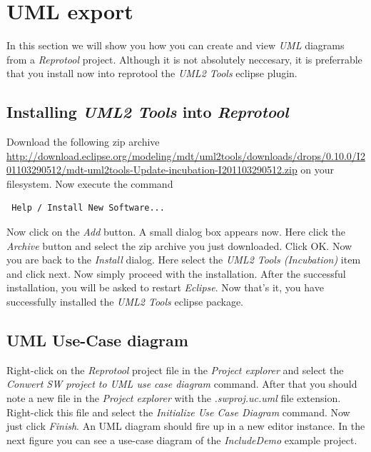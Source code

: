 \section{UML export}

In this section we will show you how you can create and view \emph{UML} diagrams from a \emph{Reprotool} project. Although it is not
absolutely neccesary, it is preferrable that you install now into reprotool the \emph{UML2 Tools} eclipse plugin.

\subsection{Installing \emph{UML2 Tools} into \emph{Reprotool}}

Download the following zip archive \url{http://download.eclipse.org/modeling/mdt/uml2tools/downloads/drops/0.10.0/I201103290512/mdt-uml2tools-Update-incubation-I201103290512.zip}
on your filesystem. Now execute the command
\begin{verbatim}
 Help / Install New Software...
\end{verbatim}
Now click on the \emph{Add} button. A small dialog box appears now. Here click the \emph{Archive} button and select the zip archive
you just downloaded. Click OK. Now you are back to the \emph{Install} dialog. Here select the \emph{UML2 Tools (Incubation)} item and
click next. Now simply proceed with the installation. After the successful installation, you will be asked to restart \emph{Eclipse}.
Now that's it, you have successfully installed the \emph{UML2 Tools} eclipse package.

\subsection{UML Use-Case diagram}

Right-click on the \emph{Reprotool} project file in the \emph{Project explorer} and select the \emph{Conwert SW project to UML use case
diagram} command. After that you should note a new file in the \emph{Project explorer} with the \emph{.swproj.uc.uml} file extension.
Right-click this file and select the \emph{Initialize Use Case Diagram} command. Now just click \emph{Finish}. An UML diagram should
fire up in a new editor instance. In the next figure you can see a use-case diagram of the \emph{IncludeDemo} example project.

\newpage

